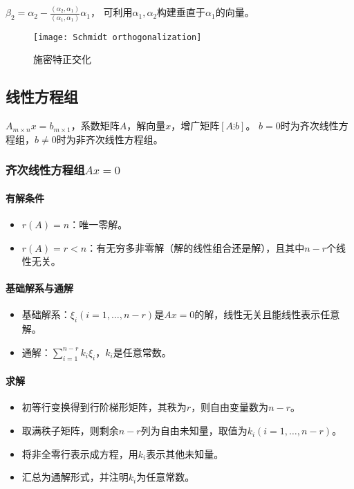 \documentclass[
12pt, %
a4paper, 
oneside, %
headinclude,footinclude, %
]{scrartcl}
\begin{document}
$ \beta_2 = \alpha_2 - \frac{(\alpha_2, \alpha_1)}{(\alpha_1, \alpha_1)}\alpha_1 $，
可利用$ \alpha_1,\alpha_2 $构建垂直于$ \alpha_1 $的向量。

\begin{figure}[H]
\centering 
\texttt{[image: Schmidt orthogonalization]} 
\caption[施密特正交化]{施密特正交化}
\end{figure}
\subsection[线性方程组]{线性方程组}
$ A_{m \times n}x = b_{m \times 1} $，系数矩阵$ A $，解向量$ x $，增广矩阵$ [A \vdots b] $。
$ b = 0 $时为齐次线性方程组，$ b \neq 0 $时为非齐次线性方程组。
\subsubsection[齐次线性方程组]{齐次线性方程组$ Ax = 0 $}
\paragraph{有解条件}
\begin{itemize}
\item $ r(A) = n $：唯一零解。
\item $ r(A) = r < n $：有无穷多非零解（解的线性组合还是解），且其中$ n - r $个线性无关。
\end{itemize}
\paragraph{基础解系与通解}
\begin{itemize}
\item 基础解系：$ \xi_i(i = 1, \dots, n - r) $是$ Ax = 0 $的解，线性无关且能线性表示任意解。
\item 通解：$ \sum_{i = 1}^{n - r} k_i \xi_i $，$ k_i $是任意常数。
\end{itemize}
\paragraph{求解}
\begin{itemize}
\item 初等行变换得到行阶梯形矩阵，其秩为$ r $，则自由变量数为$ n - r $。
\item 取满秩子矩阵，则剩余$ n - r $列为自由未知量，取值为$ k_i(i = 1, \dots, n - r) $。
\item 将非全零行表示成方程，用$ k_i $表示其他未知量。
\item 汇总为通解形式，并注明$ k_i $为任意常数。
\end{itemize}
\end{document}
